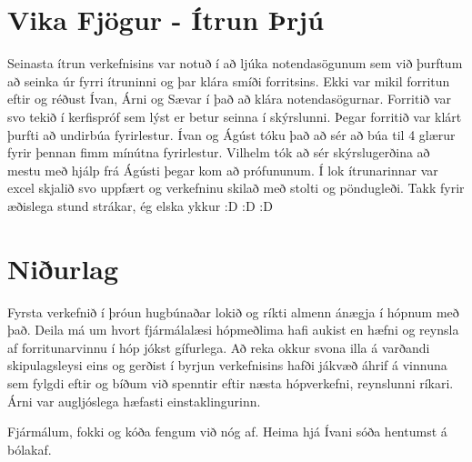 \documentclass[a4paper, 12 pt]{article}
\begin{document}
\section{Vika Fjögur - Ítrun Þrjú}
Seinasta ítrun verkefnisins var notuð í að ljúka notendasögunum sem við þurftum að seinka úr fyrri ítruninni og þar klára smíði forritsins.  Ekki var mikil forritun eftir og réðust Ívan, Árni og Sævar í það að klára notendasögurnar.  Forritið var svo tekið í kerfispróf sem lýst er betur seinna í skýrslunni.  Þegar forritið var klárt þurfti að undirbúa fyrirlestur.  Ívan og Ágúst tóku það að sér að búa til 4 glærur fyrir þennan fimm mínútna fyrirlestur.  Vilhelm tók að sér skýrslugerðina að mestu með hjálp frá Ágústi þegar kom að prófununum.  Í lok ítrunarinnar var excel skjalið svo uppfært og verkefninu skilað með stolti og pöndugleði.  Takk fyrir æðislega stund strákar, ég elska ykkur :D :D :D


\section{Niðurlag}
Fyrsta verkefnið í þróun hugbúnaðar lokið og ríkti almenn ánægja í hópnum með það.  Deila má um hvort fjármálalæsi hópmeðlima hafi aukist en hæfni og reynsla af forritunarvinnu í hóp jókst gífurlega.  Að reka okkur svona illa á varðandi skipulagsleysi eins og gerðist í byrjun verkefnisins hafði jákvæð áhrif á vinnuna sem fylgdi eftir og bíðum við spenntir eftir næsta hópverkefni, reynslunni ríkari.  
Árni var augljóslega hæfasti einstaklingurinn.

Fjármálum, fokki og kóða 
fengum við nóg af.		 
Heima hjá Ívani sóða	 
hentumst á bólakaf.		 

		
			
			
			
		
\end{document}
